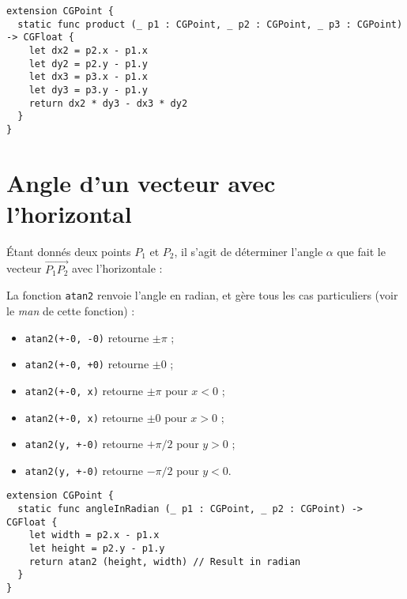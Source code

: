 \begin{lstlisting}
extension CGPoint {
  static func product (_ p1 : CGPoint, _ p2 : CGPoint, _ p3 : CGPoint) -> CGFloat {
    let dx2 = p2.x - p1.x
    let dy2 = p2.y - p1.y
    let dx3 = p3.x - p1.x
    let dy3 = p3.y - p1.y
    return dx2 * dy3 - dx3 * dy2
  }
}
\end{lstlisting}




\section{Angle d'un vecteur avec l'horizontal}

Étant donnés deux points $P_1$ et $P_2$, il s'agit de déterminer l'angle $\alpha$ que fait le vecteur $\overrightarrow{P_1P_2}$ avec l'horizontale :

\begin{center}
\end{center}

La fonction \texttt{atan2} renvoie l'angle en radian, et gère tous les cas particuliers (voir le \emph{man} de cette fonction) :
\begin{itemize}
  \item \texttt{atan2(+-0, -0)} retourne $\pm\pi$ ;
  \item \texttt{atan2(+-0, +0)} retourne $\pm0$ ;
  \item \texttt{atan2(+-0, x)} retourne $\pm\pi$ pour $x < 0$ ;
  \item \texttt{atan2(+-0, x)} retourne $\pm0$ pour $x > 0$ ;
  \item \texttt{atan2(y, +-0)} retourne $+\pi/2$ pour $y > 0$ ;
  \item \texttt{atan2(y, +-0)} retourne $-\pi/2$ pour $y < 0$.
\end{itemize}



\begin{lstlisting}
extension CGPoint {
  static func angleInRadian (_ p1 : CGPoint, _ p2 : CGPoint) -> CGFloat {
    let width = p2.x - p1.x
    let height = p2.y - p1.y
    return atan2 (height, width) // Result in radian
  }
}
\end{lstlisting}

